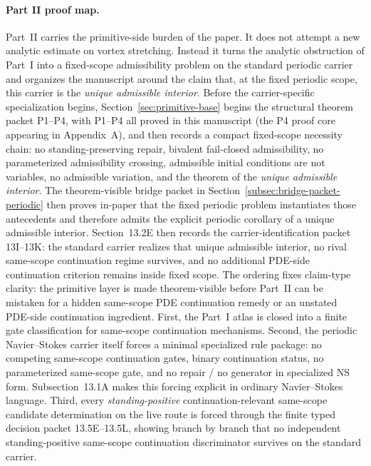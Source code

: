 \paragraph{Part II proof map.} Part~II carries the primitive-side burden of the paper. It does not attempt a new analytic estimate on vortex stretching. Instead it turns the analytic obstruction of Part~I into a fixed-scope admissibility problem on the standard periodic carrier and organizes the manuscript around the claim that, at the fixed periodic scope, this carrier is the \emph{unique admissible interior}. Before the carrier-specific specialization begins, Section~\ref{sec:primitive-base} begins the structural theorem packet P1--P4, with P1--P4 all proved in this manuscript (the P4 proof core appearing in Appendix~A), and then records a compact fixed-scope necessity chain: no standing-preserving repair, bivalent fail-closed admissibility, no parameterized admissibility crossing, admissible initial conditions are not variables, no admissible variation, and the theorem of the \emph{unique admissible interior}. The theorem-visible bridge packet in Section~\ref{subsec:bridge-packet-periodic} then proves in-paper that the fixed periodic problem instantiates those antecedents and therefore admits the explicit periodic corollary of a unique admissible interior. Section~13.2E then records the carrier-identification packet 13I--13K: the standard carrier realizes that unique admissible interior, no rival same-scope continuation regime survives, and no additional PDE-side continuation criterion remains inside fixed scope. The ordering fixes claim-type clarity: the primitive layer is made theorem-visible before Part~II can be mistaken for a hidden same-scope PDE continuation remedy or an unstated PDE-side continuation ingredient.
First, the Part~I atlas is closed into a finite gate classification for same-scope continuation mechanisms.
Second, the periodic Navier--Stokes carrier itself forces a minimal specialized rule package: no competing same-scope continuation gates, binary continuation status, no parameterized same-scope gate, and no repair / no generator in specialized NS form. Subsection~13.1A makes this forcing explicit in ordinary Navier--Stokes language.
Third, every \emph{standing-positive} continuation-relevant same-scope candidate determination on the live route is forced through the finite typed decision packet 13.5E--13.5L, showing branch by branch that no independent standing-positive same-scope continuation discriminator survives on the standard carrier.
